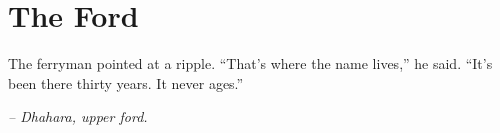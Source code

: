 \chapter*{The Ford}

The ferryman pointed at a ripple. “That’s where the name lives,” he said. “It’s been there thirty years. It never ages.”

\smallskip

\noindent \textit{– Dhahara, upper ford.}

